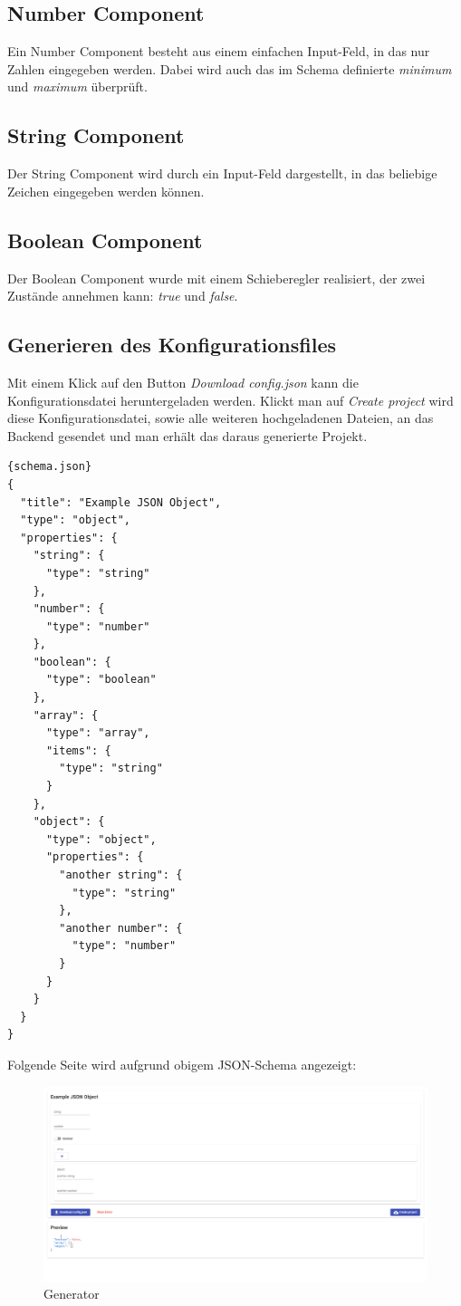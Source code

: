 \subsection{Number Component}
Ein Number Component besteht aus einem einfachen Input-Feld, in das nur Zahlen eingegeben werden.
Dabei wird auch das im Schema definierte \textit{minimum} und \textit{maximum} überprüft.

\subsection{String Component}
Der String Component wird durch ein Input-Feld dargestellt, in das beliebige Zeichen eingegeben werden können.

\subsection{Boolean Component}
Der Boolean Component wurde mit einem Schieberegler realisiert, der zwei Zustände annehmen kann: \textit{true} und
\textit{false}.

\subsection{Generieren des Konfigurationsfiles}
Mit einem Klick auf den Button \textit{Download config.json} kann die Konfigurationsdatei heruntergeladen werden.
Klickt man auf \textit{Create project} wird diese Konfigurationsdatei, sowie alle weiteren hochgeladenen Dateien, an
das Backend gesendet und man erhält das daraus generierte Projekt.

\begin{lstlisting}[label={lst:schema.json}]{schema.json}
{
  "title": "Example JSON Object",
  "type": "object",
  "properties": {
    "string": {
      "type": "string"
    },
    "number": {
      "type": "number"
    },
    "boolean": {
      "type": "boolean"
    },
    "array": {
      "type": "array",
      "items": {
        "type": "string"
      }
    },
    "object": {
      "type": "object",
      "properties": {
        "another string": {
          "type": "string"
        },
        "another number": {
          "type": "number"
        }
      }
    }
  }
}
\end{lstlisting}

Folgende Seite wird aufgrund obigem JSON-Schema angezeigt:

\begin{figure}[hbt!]
  \centering
  \includegraphics[scale=.2]{pics/generator}
  \caption{Generator}
\end{figure}


